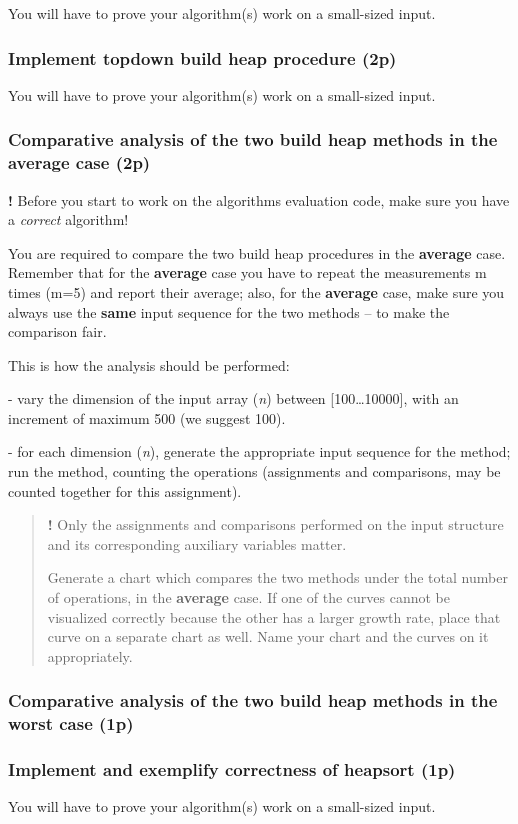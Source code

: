 \documentclass[../en-fa-lab.tex]{subfiles}
\begin{document}
You will have to prove your algorithm(s) work on a small-sized input.

\subsubsection{Implement top­down build heap procedure
(2p)}\label{implement-topdown-build-heap-procedure-2p}

You will have to prove your algorithm(s) work on a small-sized input.

\subsubsection{Comparative analysis of the two build heap methods in the
average case
(2p)}\label{comparative-analysis-of-the-two-build-heap-methods-in-the-average-case-2p}

\textbf{!} Before you start to work on the algorithms evaluation code,
make sure you have a \emph{correct} algorithm!

You are required to compare the two build heap procedures in the
\textbf{average} case. Remember that for the \textbf{average} case you
have to repeat the measurements m times (m=5) and report their average;
also, for the \textbf{average} case, make sure you always use the
\textbf{same} input sequence for the two methods -- to make the
comparison fair.

This is how the analysis should be performed:

- vary the dimension of the input array (\emph{n}) between
{[}100\ldots10000{]}, with an increment of maximum 500 (we suggest 100).

- for each dimension (\emph{n}), generate the appropriate input sequence
for the method; run the method, counting the operations (assignments and
comparisons, may be counted together for this assignment).

\begin{quote}
\textbf{!} Only the assignments and comparisons performed on the input
structure and its corresponding auxiliary variables matter.

Generate a chart which compares the two methods under the total number
of operations, in the \textbf{average} case. If one of the curves cannot
be visualized correctly because the other has a larger growth rate,
place that curve on a separate chart as well. Name your chart and the
curves on it appropriately.
\end{quote}

\subsubsection{Comparative analysis of the two build heap methods in the
worst case
(1p)}\label{comparative-analysis-of-the-two-build-heap-methods-in-the-worst-case-1p}

\subsubsection{Implement and exemplify correctness of heapsort
(1p)}\label{implement-and-exemplify-correctness-of-heapsort-1p}

You will have to prove your algorithm(s) work on a small-sized input.
\end{document}
